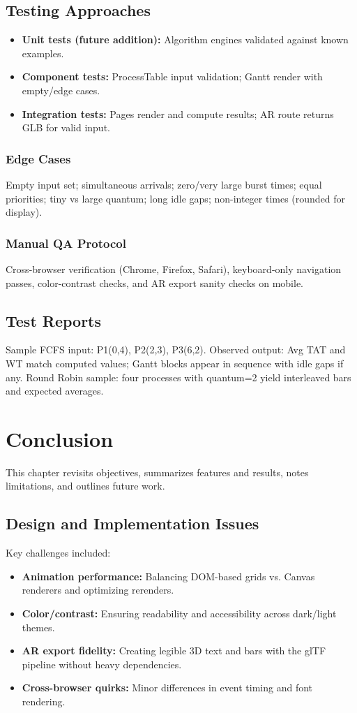 \documentclass[12pt,a4paper,oneside]{report}
\begin{document}
\section{Testing Approaches}
\begin{itemize}
  \item \textbf{Unit tests (future addition):} Algorithm engines validated against known examples.
  \item \textbf{Component tests:} ProcessTable input validation; Gantt render with empty/edge cases.
  \item \textbf{Integration tests:} Pages render and compute results; AR route returns GLB for valid input.
\end{itemize}

\subsection*{Edge Cases}
Empty input set; simultaneous arrivals; zero/very large burst times; equal priorities; tiny vs large quantum; long idle gaps; non-integer times (rounded for display).

\subsection*{Manual QA Protocol}
Cross-browser verification (Chrome, Firefox, Safari), keyboard-only navigation passes, color-contrast checks, and AR export sanity checks on mobile.

\section{Test Reports}
Sample FCFS input: P1(0,4), P2(2,3), P3(6,2). Observed output: Avg TAT and WT match computed values; Gantt blocks appear in sequence with idle gaps if any. Round Robin sample: four processes with quantum=2 yield interleaved bars and expected averages.

\chapter{Conclusion}
\noindent This chapter revisits objectives, summarizes features and results, notes limitations, and outlines future work.

\section{Design and Implementation Issues}
Key challenges included:
\begin{itemize}
  \item \textbf{Animation performance:} Balancing DOM-based grids vs. Canvas renderers and optimizing rerenders.
  \item \textbf{Color/contrast:} Ensuring readability and accessibility across dark/light themes.
  \item \textbf{AR export fidelity:} Creating legible 3D text and bars with the glTF pipeline without heavy dependencies.
  \item \textbf{Cross-browser quirks:} Minor differences in event timing and font rendering.
\end{itemize}
\end{document}
